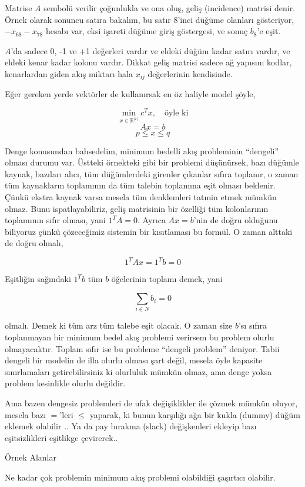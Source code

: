 \documentclass[12pt,fleqn]{article}\usepackage{../../common}
\begin{document}
Matrise $A$ sembolü verilir çoğunlukla ve ona oluş, geliş (incidence)
matrisi denir.  Örnek olarak sonuncu satıra bakalım, bu satır 8'inci düğüme
olanları gösteriyor, $-x_{68}-x_{78}$ hesabı var, eksi işareti düğüme giriş
göstergesi, ve sonuç $b_8$'e eşit. 

$A$'da sadece 0, -1 ve +1 değerleri vardır ve eldeki düğüm kadar satırı
vardır, ve eldeki kenar kadar kolonu vardır. Dikkat geliş matrisi sadece ağ
yapısını kodlar, kenarlardan giden akış miktarı hala $x_{ij}$ değerlerinin
kendisinde. 

Eğer gereken yerde vektörler de kullanırsak en öz haliyle model şöyle,

$$
\min_{x \in \mathbb{R}^{|\varepsilon|}} c^T x, \quad \textrm{öyle ki}
$$
$$
Ax = b
$$
$$
p \le x \le q
$$

Denge konusundan bahsedelim, minimum bedelli akış probleminin ``dengeli''
olması durumu var. Üstteki örnekteki gibi bir problemi düşünürsek, bazı
düğümle kaynak, bazıları alıcı, tüm düğümlerdeki girenler çıkanlar sıfıra
toplanır, o zaman tüm kaynakların toplamının da tüm talebin toplamına eşit
olması beklenir. Çünkü ekstra kaynak varsa mesela tüm denklemleri tatmin
etmek mümkün olmaz. Bunu ispatlayabiliriz, geliş matrisinin bir özelliği
tüm kolonlarının toplamının sıfır olması, yani $1^T A = 0$. Ayrıca $Ax =
b$'nin de doğru olduğunu biliyoruz çünkü çözeceğimiz sistemin bir
kısıtlaması bu formül. O zaman alttaki de doğru olmalı, 

$$
1^T A x = 1^T b = 0
$$

Eşitliğin sağındaki $1^T b$ tüm $b$ öğelerinin toplamı demek, yani

$$
\sum_{i \in N} b_i = 0
$$

olmalı. Demek ki tüm arz tüm talebe eşit olacak. O zaman size $b$'sı sıfıra
toplanmayan bir minimum bedel akış problemi verirsem bu problem olurlu
olmayacaktır. Toplam sıfır ise bu probleme ``dengeli problem''
deniyor. Tabii dengeli bir modelin de illa olurlu olması şart değil, mesela
öyle kapasite sınırlamaları getirebilirsiniz ki olurluluk mümkün olmaz, ama
denge yoksa problem kesinlikle olurlu değildir.

Ama bazen dengesiz problemleri de ufak değişiklikler ile çözmek mümkün
oluyor, mesela bazı $=$'leri $\le$ yaparak, ki bunun karşılığı ağa bir
kukla (dummy) düğüm eklemek olabilir .. Ya da pay bırakma (slack)
değişkenleri ekleyip bazı eşitsizlikleri eşitlikge çevirerek..

Örnek Alanlar 

Ne kadar çok problemin minimum akış problemi olabildiği şaşırtıcı
olabilir. 
\end{document}

